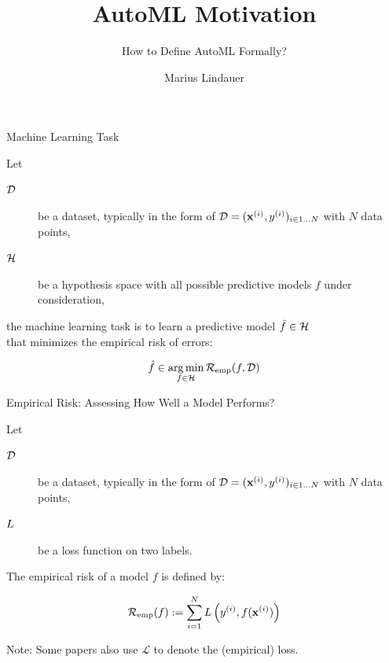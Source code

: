 \documentclass[main]{subfiles}
\title[AutoML: Introduction]{AutoML Motivation}
\subtitle{How to Define AutoML Formally?}
\author[Marius Lindauer]{Marius Lindauer}
\date{}
\begin{document}
	
	\maketitle
	

\begin{frame}[c]{Machine Learning Task}

Let  

\begin{description}
    \item[$\mathcal{D}$] be a dataset, typically in the form of $\mathcal{D} = (\mathbf{x}^{(i)},y^{(i)})_{i \in 1 \ldots N}$ with $N$ data points,
    \item[$\mathcal{H}$] be a hypothesis space with all possible predictive models $f$ under consideration,
\end{description}

the machine learning task is to learn a predictive model $\hat{f} \in \mathcal{H}$\\ that minimizes the empirical risk of errors:

$$ \hat{f} \in \operatorname*{arg\,min}_{f \in \mathcal{H}} \mathcal{R}_{\text{emp}}(f , \mathcal{D}) $$

\end{frame}
\begin{frame}[c]{Empirical Risk: Assessing How Well a Model Performs?}

Let  

\begin{description}
    \item[$\mathcal{D}$] be a dataset, typically in the form of $\mathcal{D} = (\mathbf{x}^{(i)},y^{(i)})_{i \in 1 \ldots N}$ with $N$ data points,
    \item[$L$] be a loss function on two labels.
\end{description}

The empirical risk of a model $f$ is defined by:

$$\mathcal{R}_{\text{emp}}(f) := \sum_{i=1}^{N} L\left(y^{(i)}, f(\mathbf{x}^{(i)})\right)$$

\bigskip 

Note: Some papers also use $\mathcal{L}$ to denote the (empirical) loss.

\end{frame}
\end{document}
